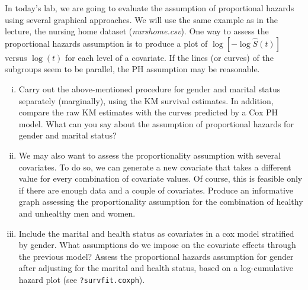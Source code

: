 In today's lab, we are going to evaluate the assumption of proportional hazards using 
several graphical approaches. We will use the same example as in the lecture, the 
nursing home dataset (\emph{nurshome.csv}). One way to assess the proportional hazards assumption is to produce a plot of $\log[-\log \hat{S}(t)]$ versus $\log(t)$ for each level of a covariate. If the lines (or curves) of the subgroups seem to be parallel, the PH assumption may be reasonable. 
\begin{enumerate}[(i)]
\item Carry out the above-mentioned procedure for gender and marital status separately (marginally), using the KM survival estimates. In addition, compare the raw KM estimates with the curves predicted by a Cox PH model. What can you say about the assumption of proportional hazards for gender and marital 
status?
\item We may also want to assess the proportionality assumption with several covariates. To do so, we can generate a new covariate that takes a different value for every 
combination of covariate values. Of course, this is feasible only if there are enough data and a 
couple of covariates. Produce an informative graph assessing the proportionality assumption for the combination of healthy and unhealthy men and women.
\item  Include the marital and health status as covariates in a cox model stratified by gender. What assumptions do we impose on the covariate effects through the previous model? Assess the proportional hazards assumption for gender after adjusting for the marital and health status, based on a log-cumulative hazard plot (see \verb|?survfit.coxph|).
\end{enumerate}